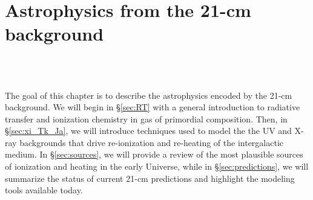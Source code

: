 

\chapter{Astrophysics from the 21-cm background}

\begin{bf}
  \author{Jordan Mirocha}\\
\\
\end{bf}

The goal of this chapter is to describe the astrophysics encoded by the 21-cm background. We will begin in \S\ref{sec:RT} with a general introduction to radiative transfer and ionization chemistry in gas of primordial composition. Then, in \S\ref{sec:xi_Tk_Ja}, we will introduce techniques used to model the the UV and X-ray backgrounds that drive re-ionization and re-heating of the intergalactic medium. In \S\ref{sec:sources}, we will provide a review of the most plausible sources of ionization and heating in the early Universe, while in \S\ref{sec:predictions}, we will summarize the status of current 21-cm predictions and highlight the modeling tools available today.



%
%



